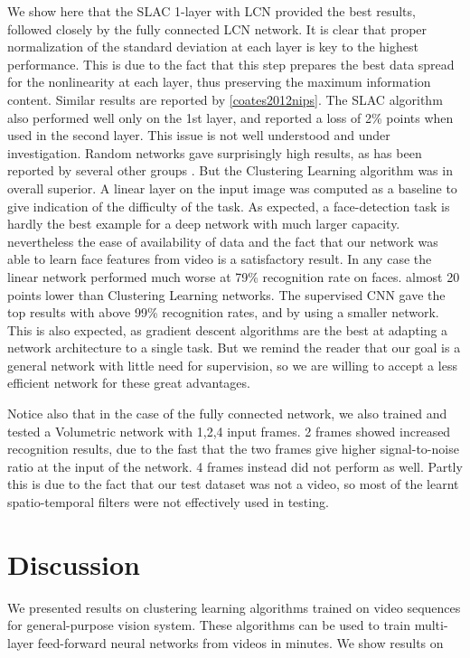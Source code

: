 \documentclass{article} %
\begin{document}
We show here that the SLAC 1-layer with LCN provided the best results, followed closely by the fully connected LCN network. It is clear that proper normalization of the standard deviation at each layer is key to the highest performance. This is due to the fact that this step prepares the best data spread for the nonlinearity at each layer, thus preserving the maximum information content. Similar results are reported by \ref{coates2012nips}. 
The SLAC algorithm also performed well only on the 1st layer, and reported a loss of 2\% points when used in the second layer. This issue is not well understood and under investigation. 
Random networks gave surprisingly high results, as has been reported by several other groups \cite{}. But the Clustering Learning algorithm was in overall superior. 
A linear layer on the input image was computed as a baseline to give indication of the difficulty of the task. As expected, a face-detection task is hardly the best example for a deep network with much larger capacity. nevertheless the ease of availability of data and the fact that our network was able to learn face features from video is a satisfactory result. In any case the linear network performed much worse at 79\% recognition rate on faces. almost 20 points lower than Clustering Learning networks.
The supervised CNN gave the top results with above 99\% recognition rates, and by using a smaller network. This is also expected, as gradient descent algorithms are the best at adapting a network architecture to a single task. But we remind the reader that our goal is a general network with little need for supervision, so we are willing to accept a less efficient network for these great advantages. 

Notice also that in the case of the fully connected network, we also trained and tested a Volumetric network with 1,2,4 input frames. 
2 frames showed increased recognition results, due to the fast that the two frames give higher signal-to-noise ratio at the input of the network. 4 frames instead did not perform as well. Partly this is due to the fact that our test dataset was not a video, so most of the learnt spatio-temporal filters were not effectively used in testing.


\section{Discussion}

We presented results on clustering learning algorithms trained on video sequences for general-purpose vision system. These algorithms can be used to train multi-layer feed-forward neural networks from videos in minutes. We show results on 
\end{document}
